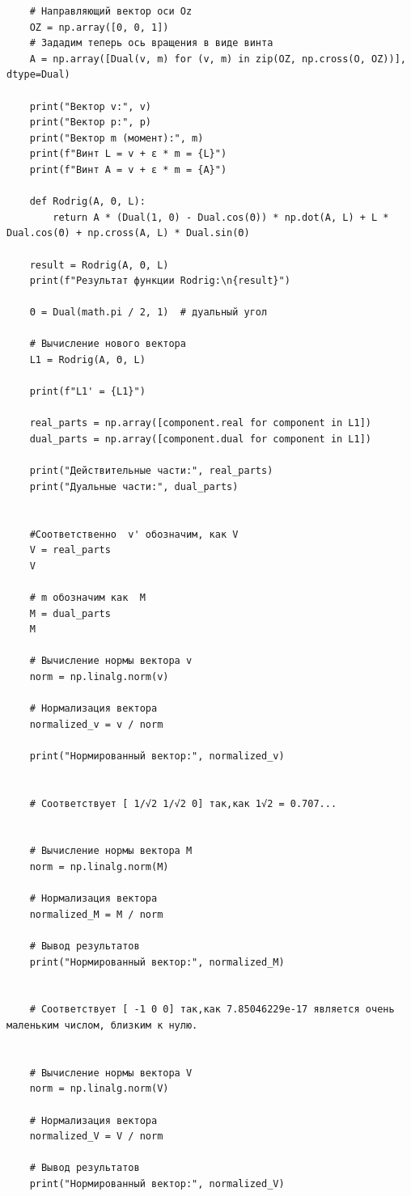 \begin{verbatim}
    # Направляющий вектор оси Oz
    OZ = np.array([0, 0, 1])
    # Зададим теперь ось вращения в виде винта
    A = np.array([Dual(v, m) for (v, m) in zip(OZ, np.cross(O, OZ))], dtype=Dual)

    print("Вектор v:", v)
    print("Вектор p:", p)
    print("Вектор m (момент):", m)
    print(f"Винт L = v + ε * m = {L}")
    print(f"Винт A = v + ε * m = {A}")

    def Rodrig(A, Θ, L):
        return A * (Dual(1, 0) - Dual.cos(Θ)) * np.dot(A, L) + L * Dual.cos(Θ) + np.cross(A, L) * Dual.sin(Θ)

    result = Rodrig(A, Θ, L)
    print(f"Результат функции Rodrig:\n{result}")

    Θ = Dual(math.pi / 2, 1)  # дуальный угол

    # Вычисление нового вектора
    L1 = Rodrig(A, Θ, L)

    print(f"L1' = {L1}")

    real_parts = np.array([component.real for component in L1])
    dual_parts = np.array([component.dual for component in L1])

    print("Действительные части:", real_parts)
    print("Дуальные части:", dual_parts)


    #Соответственно  v' обозначим, как V
    V = real_parts
    V

    # m обозначим как  M
    M = dual_parts
    M

    # Вычисление нормы вектора v
    norm = np.linalg.norm(v)

    # Нормализация вектора
    normalized_v = v / norm

    print("Нормированный вектор:", normalized_v)


    # Соответствует [ 1/√2 1/√2 0] так,как 1√2 = 0.707...


    # Вычисление нормы вектора M
    norm = np.linalg.norm(M)

    # Нормализация вектора
    normalized_M = M / norm

    # Вывод результатов
    print("Нормированный вектор:", normalized_M)


    # Соответствует [ -1 0 0] так,как 7.85046229e-17 является очень маленьким числом, близким к нулю.


    # Вычисление нормы вектора V
    norm = np.linalg.norm(V)

    # Нормализация вектора
    normalized_V = V / norm

    # Вывод результатов
    print("Нормированный вектор:", normalized_V)


\end{verbatim}
